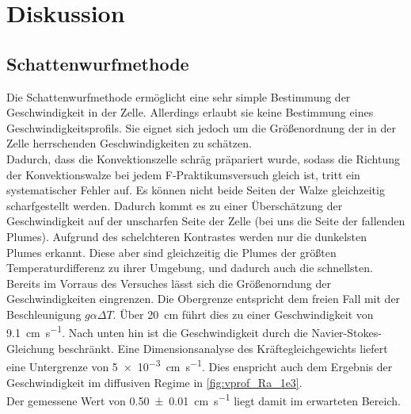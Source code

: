 \section{Diskussion}
\subsection{Schattenwurfmethode}
Die Schattenwurfmethode ermöglicht eine sehr simple Bestimmung der Geschwindigkeit in der Zelle. Allerdings erlaubt sie keine Bestimmung eines Geschwindigkeitsprofils. 
Sie eignet sich jedoch um die Größenordnung der in der Zelle herrschenden Geschwindigkeiten zu schätzen.
\\
Dadurch, dass die Konvektionszelle schräg präpariert wurde, sodass die Richtung der Konvektionswalze bei jedem F-Praktikumsversuch gleich ist, tritt ein systematischer Fehler auf.
Es können nicht beide Seiten der Walze gleichzeitig scharfgestellt werden.
Dadurch kommt es zu einer Überschätzung der Geschwindigkeit auf der unscharfen Seite der Zelle (bei uns die Seite der fallenden Plumes). 
Aufgrund des schelchteren Kontrastes werden nur die dunkelsten Plumes erkannt. Diese aber sind gleichzeitig die Plumes der größten Temperaturdifferenz zu ihrer Umgebung, und dadurch auch die schnellsten.
\\
Bereits im Vorraus des Versuches lässt sich die Größenorndung der Geschwindigkeiten eingrenzen. Die Obergrenze entspricht dem freien Fall mit der Beschleunigung $g\alpha\Delta T$. Über \SI{20}{\centi\meter} führt dies zu einer Geschwindigkeit von \SI{9.1}{\centi\meter\per\second}. 
Nach unten hin ist die Geschwindigkeit durch die Navier-Stokes-Gleichung beschränkt. Eine Dimensionsanalyse des Kräftegleichgewichts liefert eine Untergrenze von \SI{5e-3}{\centi\meter\per\second}. Dies enspricht auch dem Ergebnis der Geschwindigkeit im diffusiven Regime in \cref{fig:vprof_Ra_1e3}.
\\
Der gemessene Wert von \SI{0.50\pm0.01}{\centi\meter\per\second} liegt damit im erwarteten Bereich.

